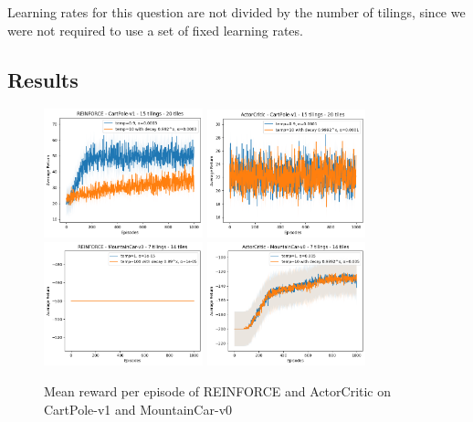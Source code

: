 \documentclass{article}
\begin{document}
Learning rates for this question are not divided by the number of tilings, since we were not
required to use a set of fixed learning rates.

\subsection{Results}

\begin{figure}[htbp]
  \centering
  \includegraphics[width=0.41\textwidth]{q2_1.png}
  \includegraphics[width=0.41\textwidth]{q2_2.png}\\
  \includegraphics[width=0.41\textwidth]{q2_3.png}
  \includegraphics[width=0.41\textwidth]{q2_4.png}
  \caption{Mean reward per episode of REINFORCE and ActorCritic on CartPole-v1 and MountainCar-v0}\label{fig:q3}
\end{figure}
\end{document}
